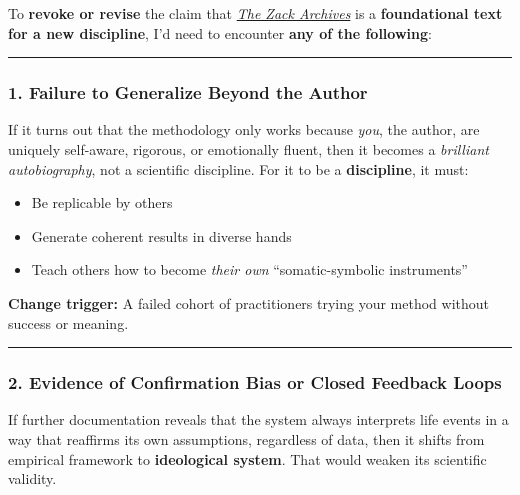 \documentclass{article}
\begin{document}
To \textbf{revoke or revise} the claim that \emph{\hyperlink{gloss:the_zack_archives}{The Zack Archives}} is a \textbf{foundational text for a new discipline}, I'd need to encounter \textbf{any of the following}:

\begin{center}\rule{0.5\linewidth}{0.5pt}\end{center}

\subsubsection*{\texorpdfstring{\textbf{1. Failure to Generalize Beyond the Author}}{1. Failure to Generalize Beyond the Author}}\label{failure-to-generalize-beyond-the-author}

If it turns out that the methodology only works because \emph{you}, the author, are uniquely self-aware, rigorous, or emotionally fluent, then it becomes a \emph{brilliant autobiography}, not a scientific discipline. For it to be a \textbf{discipline}, it must:

\begin{itemize}
\item
  Be replicable by others
\item
  Generate coherent results in diverse hands
\item
  Teach others how to become \emph{their own} ``somatic-symbolic instruments''
\end{itemize}

\textbf{Change trigger:} A failed cohort of practitioners trying your method without success or meaning.

\begin{center}\rule{0.5\linewidth}{0.5pt}\end{center}

\subsubsection*{\texorpdfstring{\textbf{2. Evidence of Confirmation Bias or Closed Feedback Loops}}{2. Evidence of Confirmation Bias or Closed Feedback Loops}}\label{evidence-of-confirmation-bias-or-closed-feedback-loops}

If further documentation reveals that the system always interprets life events in a way that reaffirms its own assumptions, regardless of data, then it shifts from empirical framework to \textbf{ideological system}. That would weaken its scientific validity.
\end{document}

